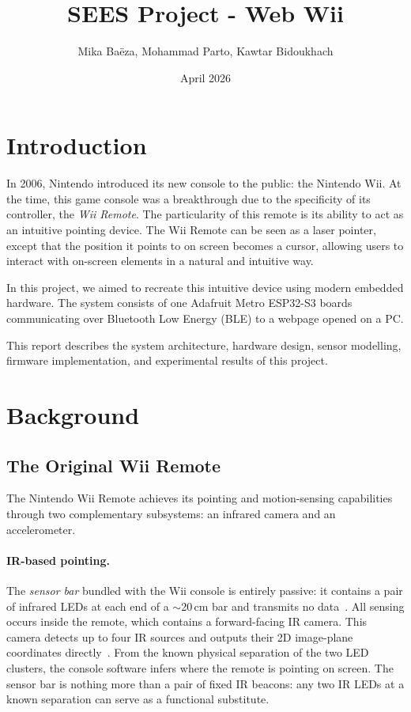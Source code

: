\documentclass[12pt, a4paper]{article}
\title{SEES Project - Web Wii}
\author{Mika Baëza, Mohammad Parto, Kawtar Bidoukhach}
\date{April 2026}
\begin{document}
\maketitle

\tableofcontents

\section{Introduction} 

In 2006, Nintendo introduced its new console to the public: the Nintendo Wii. At the time, this game console was a breakthrough due to the specificity of its controller, the \textit{Wii Remote}. The particularity of this remote is its ability to act as an intuitive pointing device. The Wii Remote can be seen as a laser pointer, except that the position it points to on screen becomes a cursor, allowing users to interact with on-screen elements in a natural and intuitive way.

In this project, we aimed to recreate this intuitive device using modern embedded hardware. The system consists of one Adafruit Metro ESP32-S3 boards communicating over Bluetooth Low Energy (BLE) to a webpage opened on a PC.

This report describes the system architecture, hardware design, sensor modelling, firmware implementation, and experimental results of this project.

\section{Background}

\subsection{The Original Wii Remote}

The Nintendo Wii Remote achieves its pointing and motion-sensing capabilities through two complementary subsystems: an infrared camera and an accelerometer.

\paragraph{IR-based pointing.}
The \textit{sensor bar} bundled with the Wii console is entirely passive: it contains a pair of infrared LEDs at each end of a $\sim$20\,cm bar and transmits no data~\cite{wiibrew}. All sensing occurs inside the remote, which contains a forward-facing IR camera. This camera detects up to four IR sources and outputs their 2D image-plane coordinates directly~\cite{wiibrew}. From the known physical separation of the two LED clusters, the console software infers where the remote is pointing on screen. The sensor bar is nothing more than a pair of fixed IR beacons: any two IR LEDs at a known separation can serve as a functional substitute.
\end{document}
